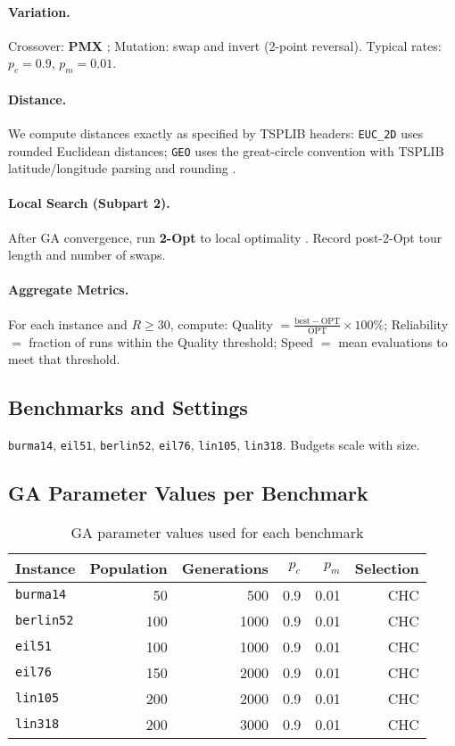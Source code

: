 \documentclass{article}
\begin{document}
\paragraph{Variation.} Crossover: \textbf{PMX} \cite{goldberg1985pmx}; Mutation: swap and invert (2-point reversal). Typical rates: $p_c{=}0.9$, $p_m{=}0.01$.
\paragraph{Distance.} We compute distances exactly as specified by TSPLIB headers: \texttt{EUC\_2D} uses rounded Euclidean distances; \texttt{GEO} uses the great-circle convention with TSPLIB latitude/longitude parsing and rounding \cite{reinelt1991tsplib}.
\paragraph{Local Search (Subpart 2).} After GA convergence, run \textbf{2-Opt} to local optimality \cite{lin1973lk}. Record post-2-Opt tour length and number of swaps.
\paragraph{Aggregate Metrics.} For each instance and $R\ge 30$, compute:
Quality $=\frac{\overline{\text{best}}-\text{OPT}}{\text{OPT}}\times100\%$;
Reliability $=$ fraction of runs within the Quality threshold;
Speed $=$ mean evaluations to meet that threshold.

\subsection{Benchmarks and Settings}
\texttt{burma14}, \texttt{eil51}, \texttt{berlin52}, \texttt{eil76}, \texttt{lin105}, \texttt{lin318}. Budgets scale with size.

\subsection{GA Parameter Values per Benchmark}
\begin{table}[H]
\centering
\caption{GA parameter values used for each benchmark}
\begin{tabular}{lrrrrr}
\toprule
Instance & Population & Generations & $p_c$ & $p_m$ & Selection \\
\midrule
\texttt{burma14} & 50 & 500 & 0.9 & 0.01 & CHC \\
\texttt{berlin52} & 100 & 1000 & 0.9 & 0.01 & CHC \\
\texttt{eil51} & 100 & 1000 & 0.9 & 0.01 & CHC \\
\texttt{eil76} & 150 & 2000 & 0.9 & 0.01 & CHC \\
\texttt{lin105} & 200 & 2000 & 0.9 & 0.01 & CHC \\
\texttt{lin318} & 200 & 3000 & 0.9 & 0.01 & CHC \\
\bottomrule
\end{tabular}
\end{table}
\end{document}
